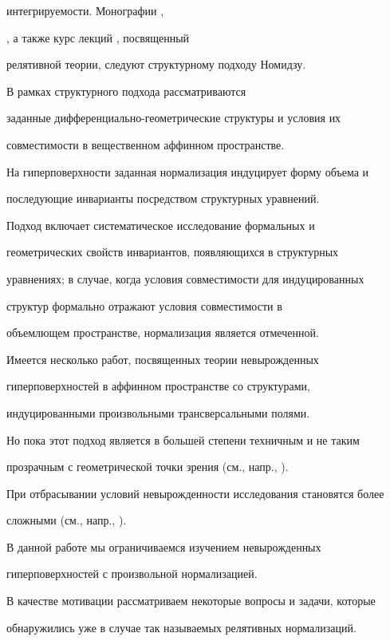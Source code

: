 интегрируемости. Монографии \cite{NOM-SA},


\cite{LI-S-Z-1}, а также курс лекций \cite{SIM-S-V}, посвященный


релятивной теории, следуют структурному подходу Номидзу.


В рамках структурного подхода рассматриваются


заданные дифференциально-геометрические структуры и условия их


совместимости в вещественном аффинном пространстве.


На гиперповерхности заданная нормализация индуцирует форму объема и


последующие инварианты посредством структурных уравнений.


Подход включает систематическое исследование формальных и


геометрических свойств инвариантов, появляющихся в структурных


уравнениях; в случае, когда условия совместимости для индуцированных


структур формально отражают условия совместимости в


объемлющем пространстве, нормализация является отмеченной.





Имеется несколько работ, посвященных теории невырожденных


гиперповерхностей в аффинном пространстве со структурами,


индуцированными произвольными трансверсальными полями.


Но пока этот подход является в большей степени техничным и не таким


прозрачным с геометрической точки зрения (см., напр., \cite{IVA}).


При отбрасывании условий невырожденности исследования становятся более


сложными (см., напр., \cite{OPO}).


В данной работе мы ограничиваемся изучением невырожденных


гиперповерхностей с произвольной нормализацией.


В качестве мотивации рассматриваем некоторые вопросы и задачи, которые


обнаружились уже в случае так называемых релятивных нормализаций.


